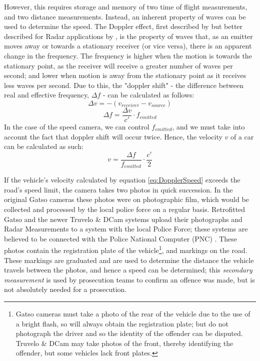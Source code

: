 \documentclass[11pt, a4paper, notitlepage]{report}
\begin{document}
However, this requires storage and memory of two time of flight measurements, and two distance measurements. Instead, an inherent property of waves can be used to determine the speed. The Doppler effect, first described by \citet{dopplerGerman} but better described for Radar applications by \citet{dopplerWolff}, is the property of waves that, as an emitter moves away or towards a stationary receiver (or vice versa), there is an apparent change in the frequency. The frequency is higher when the motion is towards the stationary point, as the receiver will receive a greater number of waves per second; and lower when motion is away from the stationary point as it receives less waves per second. Due to this, the "doppler shift" - the difference between real and effective frequency, $ \Delta f $ - can be calculated as follows:
\begin{equation}
	\Delta v = -(v_{receiver} - v_{source})
\end{equation}
\begin{equation}
	\Delta f = \frac{\Delta v}{c'} \cdot f_{emitted}
\end{equation}
In the case of the speed camera, we can control $ f_{emitted} $, and we must take into account the fact that doppler shift will occur twice. Hence, the velocity $ v $ of a car can be calculated as such:
\begin{equation}\label{eq:DopplerSpeed}
	v = \frac{\Delta f}{f_{emitted}} \cdot \frac{c'}{2}
\end{equation}

If the vehicle's velocity calculated by equation \ref{eq:DopplerSpeed} exceeds the road's speed limit, the camera takes two photos in quick succession. In the original Gatso cameras these photos were on photographic film, which would be collected and processed by the local police force on a regular basis. Retrofitted Gatso and the newer Truvelo \& DCam systems upload their photographs and Radar Measurements to a system with the local Police Force; these systems are believed to be connected with the Police National Computer (PNC) \citep{PNC}. These photos contain the registration plate of the vehicle\footnote{Gatso cameras must take a photo of the rear of the vehicle due to the use of a bright flash, so will always obtain the registration plate; but do not photograph the driver and so the identity of the offender can be disputed. Truvelo \& DCam may take photos of the front, thereby identifying the offender, but some vehicles lack front plates.}, and markings on the road. These markings are graduated and are used to determine the distance the vehicle travels between the photos, and hence a speed can be determined; this \textit{secondary measurement} is used by prosecution teams to confirm an offence was made, but is not absolutely needed for a prosecution.
\end{document}
